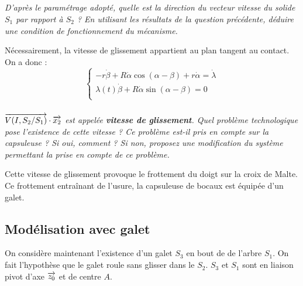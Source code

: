 \documentclass[10pt,fleqn]{article} %
\begin{document}
\begin{multicols}{2}
\begin{corrige}
\end{corrige}
\else \fi

\subparagraph{}
\textit{D'après le paramétrage adopté, quelle est la direction du vecteur vitesse du solide $S_1$ par rapport à $S_2$ ? %
En utilisant les résultats de la question précédente, déduire une condition de fonctionnement du mécanisme.}


\ifprof%
\begin{corrige}


Nécessairement, la vitesse de glissement appartient au plan tangent au contact. On a donc :
$$
\left\{
\begin{array}{l}
- r\dot{\beta}+ R\dot{\alpha}\cos(\alpha-\beta)  +r\dot{\alpha} = \dot{\lambda}\\
 \lambda(t) \dot{\beta}+  R\dot{\alpha}\sin(\alpha-\beta)=0\\
\end{array}
\right.
$$

\end{corrige}
\else\fi

\subparagraph{}
\textit{$\overrightarrow{V(I,S_2/S_1)}\cdot\overrightarrow{x_2}$ est appelée \textbf{vitesse de glissement}. Quel problème technologique pose l'existence de cette vitesse ? Ce problème est-il pris en compte sur la capsuleuse ? Si oui, comment ? Si non, proposez une modification du système permettant la prise en compte de ce problème.}

\ifprof%
\begin{corrige}

Cette vitesse de glissement provoque le frottement du doigt sur la croix de Malte. Ce frottement entraînant de l'usure, la capsuleuse de bocaux est équipée d'un galet.

\end{corrige}
\else\fi


\subsection*{Modélisation avec galet}

On considère maintenant l'existence d'un galet $S_3$ en bout de de l'arbre $S_1$. On fait l'hypothèse que le galet roule sans glisser dans le $S_2$. $S_3$ et $S_1$ sont en liaison pivot d'axe $\overrightarrow{z_0}$ et de centre $A$.


\end{multicols}
\end{document}
